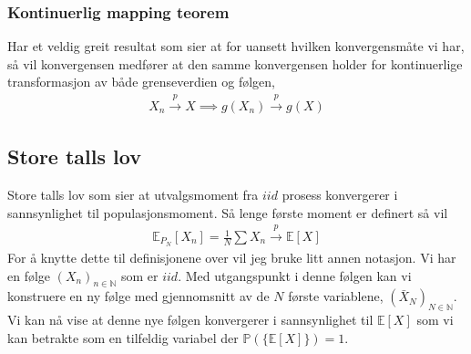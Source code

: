 \subsubsection{Kontinuerlig mapping teorem}
Har et veldig greit resultat som sier at for uansett hvilken konvergensmåte vi har, så vil konvergensen medfører at den samme konvergensen holder for kontinuerlige transformasjon av både grenseverdien og følgen,
\begin{align}
X_n \overset{p}{\rightarrow} X \implies g(X_n)\overset{p}{\rightarrow}g(X)
\end{align}
\subsection{Store talls lov}
Store talls lov som sier at utvalgsmoment fra $iid$ prosess konvergerer i sannsynlighet til populasjonsmoment. Så lenge første moment er definert så vil
\begin{align}
\mathbb{E}_{P_N}[X_n] = \frac{1}{N}\sum X_n \overset{p}{\rightarrow} \mathbb{E}[X]
\end{align}
For å knytte dette til definisjonene over vil jeg bruke litt annen notasjon. Vi har en følge $(X_n)_{n\in \mathbb{N}}$ som er $iid$. Med utgangspunkt i denne følgen kan vi konstruere en ny følge med gjennomsnitt av de $N$ første variablene, $(\bar{X}_N)_{N \in \mathbb{N}}$. Vi kan nå vise at denne nye følgen konvergerer i sannsynlighet til $\mathbb{E}[X]$ som vi kan betrakte som en tilfeldig variabel der $\mathbb{P}(\{\mathbb{E}[X]\})=1$.
